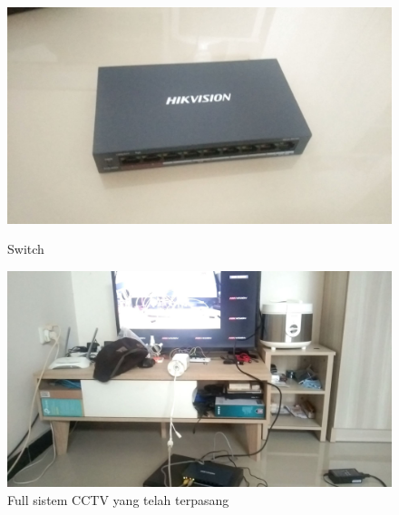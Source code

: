\begin{figure} [p] \centering  
  \includegraphics[scale=0.1]{gambar/cctvswitch.jpg}
  \caption{Switch}
  \label{fig:switch}

  \includegraphics[scale=0.1]{gambar/cctvfullsistem.jpg}
  \caption{Full sistem CCTV yang telah terpasang}
  \label{fig:fullsistemcctv}
\end{figure}




% 
